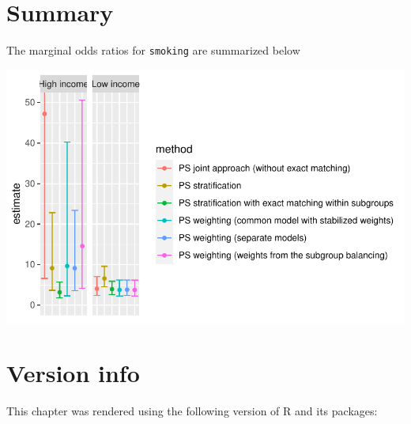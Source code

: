 \documentclass[
  letterpaper,
  DIV=11,
  numbers=noendperiod]{scrreprt}
\begin{document}
\hypertarget{summary}{%
\section{Summary}\label{summary}}

The marginal odds ratios for \texttt{smoking} are summarized below

\includegraphics{chapter_07_files/figure-pdf/unnamed-chunk-53-1.pdf}

\hypertarget{version-info-2}{%
\section*{Version info}\label{version-info-2}}


This chapter was rendered using the following version of R and its
packages:
\end{document}

